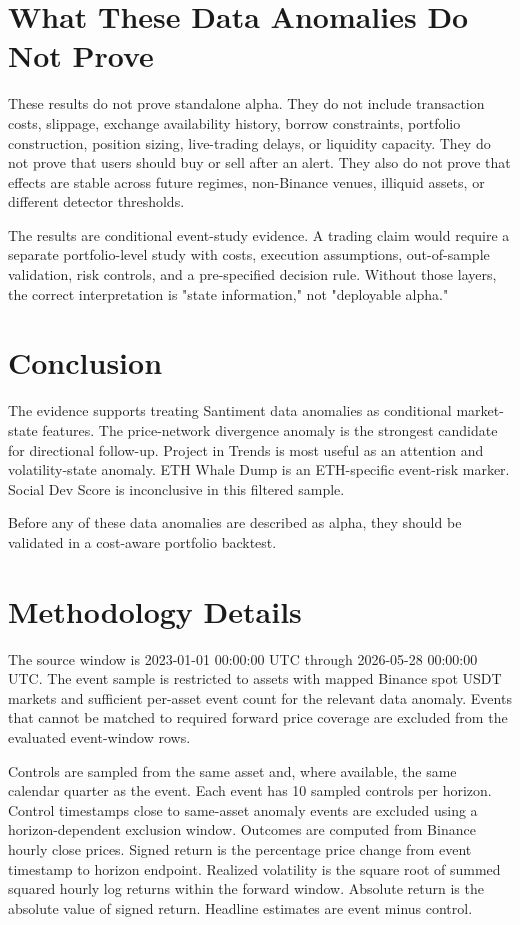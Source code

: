 \documentclass[11pt]{article}
\begin{document}
\section{What These Data Anomalies Do Not Prove}
These results do not prove standalone alpha. They do not include transaction costs, slippage, exchange availability history, borrow constraints, portfolio construction, position sizing, live-trading delays, or liquidity capacity. They do not prove that users should buy or sell after an alert. They also do not prove that effects are stable across future regimes, non-Binance venues, illiquid assets, or different detector thresholds.

The results are conditional event-study evidence. A trading claim would require a separate portfolio-level study with costs, execution assumptions, out-of-sample validation, risk controls, and a pre-specified decision rule. Without those layers, the correct interpretation is "state information," not "deployable alpha."

\section{Conclusion}
The evidence supports treating Santiment data anomalies as conditional market-state features. The price-network divergence anomaly is the strongest candidate for directional follow-up. Project in Trends is most useful as an attention and volatility-state anomaly. ETH Whale Dump is an ETH-specific event-risk marker. Social Dev Score is inconclusive in this filtered sample.

Before any of these data anomalies are described as alpha, they should be validated in a cost-aware portfolio backtest.

\appendix
\section{Methodology Details}
The source window is 2023-01-01 00:00:00 UTC through 2026-05-28 00:00:00 UTC. The event sample is restricted to assets with mapped Binance spot USDT markets and sufficient per-asset event count for the relevant data anomaly. Events that cannot be matched to required forward price coverage are excluded from the evaluated event-window rows.

Controls are sampled from the same asset and, where available, the same calendar quarter as the event. Each event has 10 sampled controls per horizon. Control timestamps close to same-asset anomaly events are excluded using a horizon-dependent exclusion window. Outcomes are computed from Binance hourly close prices. Signed return is the percentage price change from event timestamp to horizon endpoint. Realized volatility is the square root of summed squared hourly log returns within the forward window. Absolute return is the absolute value of signed return. Headline estimates are event minus control.
\end{document}
